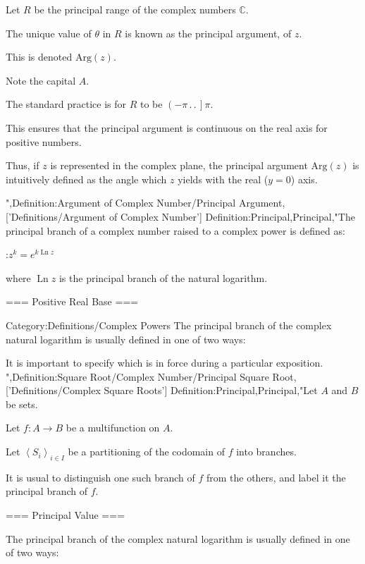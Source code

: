 Let $R$ be the principal range of the complex numbers $\mathbb C$.

The unique value of $\theta$ in $R$ is known as the principal argument, of $z$.

This is denoted $\mathrm {Arg} \left( z \right)$.

Note the capital $A$.

The standard practice is for $R$ to be $\left( -\pi \,.\,.\,   \right]\pi$.

This ensures that the principal argument is continuous on the real axis for positive numbers.

Thus, if $z$ is represented in the complex plane, the principal argument $\mathrm {Arg} \left( z \right)$ is intuitively defined as the angle which $z$ yields with the real ($y = 0$) axis.



",Definition:Argument of Complex Number/Principal Argument,['Definitions/Argument of Complex Number']
Definition:Principal,Principal,"The principal branch of a complex number raised to a complex power is defined as:

:$z^k = e^{k \operatorname {Ln} z}$

where $\operatorname {Ln} z$ is the principal branch of the natural logarithm.


=== Positive Real Base ===


Category:Definitions/Complex Powers
The principal branch of the complex natural logarithm is usually defined in one of two ways:






It is important to specify which is in force during a particular exposition.
",Definition:Square Root/Complex Number/Principal Square Root,['Definitions/Complex Square Roots']
Definition:Principal,Principal,"Let $A$ and $B$ be sets.

Let $f: A \to B$ be a multifunction on $A$.

Let $\left\langle S_i \right\rangle_{i \mathop \in I}$ be a partitioning of the codomain of $f$ into branches.


It is usual to distinguish one such branch of $f$ from the others, and label it the principal branch of $f$.


=== Principal Value ===

The principal branch of the complex natural logarithm is usually defined in one of two ways:






